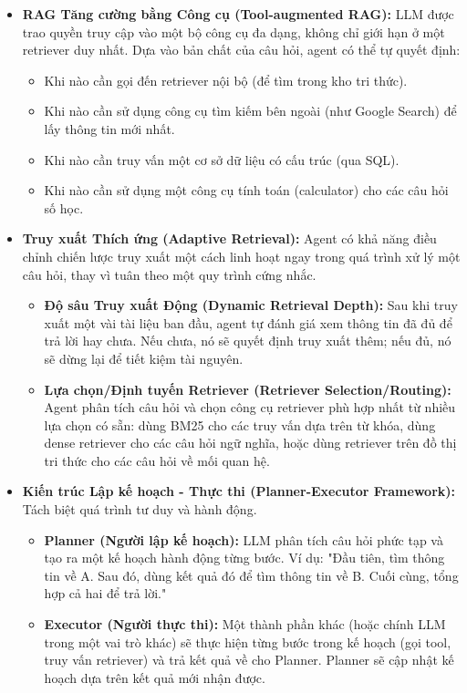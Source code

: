 \begin{itemize}
    \begin{itemize}
        \item \textbf{RAG Tăng cường bằng Công cụ (Tool-augmented RAG):} 
        LLM được trao quyền truy cập vào một bộ công cụ đa dạng, không chỉ giới hạn ở một retriever duy nhất. Dựa vào bản chất của câu hỏi, agent có thể tự quyết định:
        \begin{itemize}
            \item Khi nào cần gọi đến retriever nội bộ (để tìm trong kho tri thức).
            \item Khi nào cần sử dụng công cụ tìm kiếm bên ngoài (như Google Search) để lấy thông tin mới nhất.
            \item Khi nào cần truy vấn một cơ sở dữ liệu có cấu trúc (qua SQL).
            \item Khi nào cần sử dụng một công cụ tính toán (calculator) cho các câu hỏi số học.
        \end{itemize}

        \item \textbf{Truy xuất Thích ứng (Adaptive Retrieval):} 
        Agent có khả năng điều chỉnh chiến lược truy xuất một cách linh hoạt ngay trong quá trình xử lý một câu hỏi, thay vì tuân theo một quy trình cứng nhắc.
        \begin{itemize}
            \item \textbf{Độ sâu Truy xuất Động (Dynamic Retrieval Depth):} 
            Sau khi truy xuất một vài tài liệu ban đầu, agent tự đánh giá xem thông tin đã đủ để trả lời hay chưa. Nếu chưa, nó sẽ quyết định truy xuất thêm; nếu đủ, nó sẽ dừng lại để tiết kiệm tài nguyên.
            \item \textbf{Lựa chọn/Định tuyến Retriever (Retriever Selection/Routing):} 
            Agent phân tích câu hỏi và chọn công cụ retriever phù hợp nhất từ nhiều lựa chọn có sẵn: dùng BM25 cho các truy vấn dựa trên từ khóa, dùng dense retriever cho các câu hỏi ngữ nghĩa, hoặc dùng retriever trên đồ thị tri thức cho các câu hỏi về mối quan hệ.
        \end{itemize}

        \item \textbf{Kiến trúc Lập kế hoạch - Thực thi (Planner-Executor Framework):} 
        Tách biệt quá trình tư duy và hành động.
        \begin{itemize}
            \item \textbf{Planner (Người lập kế hoạch):} 
            LLM phân tích câu hỏi phức tạp và tạo ra một kế hoạch hành động từng bước. Ví dụ: "Đầu tiên, tìm thông tin về A. Sau đó, dùng kết quả đó để tìm thông tin về B. Cuối cùng, tổng hợp cả hai để trả lời."
            \item \textbf{Executor (Người thực thi):} 
            Một thành phần khác (hoặc chính LLM trong một vai trò khác) sẽ thực hiện từng bước trong kế hoạch (gọi tool, truy vấn retriever) và trả kết quả về cho Planner. Planner sẽ cập nhật kế hoạch dựa trên kết quả mới nhận được.
        \end{itemize}


\end{itemize}
\end{itemize}

